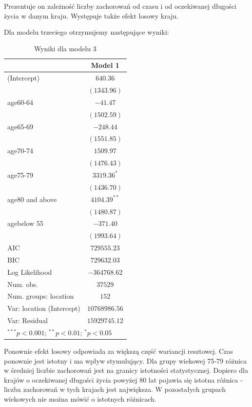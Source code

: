 \documentclass[12pt]{mwbk}
\theoremstyle{plain}
\theoremstyle{definition}
\theoremstyle{remark}
\begin{document}
Prezentuje on zależność liczby zachorowań od czasu i od oczekiwanej długości życia w danym kraju. Występuje także efekt losowy kraju.

Dla modelu trzeciego otrzymujemy następujące wyniki:

\begin{table}
	\begin{center}
		\begin{tabular}{l c}
			\hline
			& Model 1 \\
			\hline
			(Intercept)               & $640.36$       \\
			& $(1343.96)$    \\
			age60-64                  & $-41.47$       \\
			& $(1502.59)$    \\
			age65-69                  & $-248.44$      \\
			& $(1551.85)$    \\
			age70-74                  & $1509.97$      \\
			& $(1476.43)$    \\
			age75-79                  & $3319.36^{*}$  \\
			& $(1436.70)$    \\
			age80 and above           & $4104.39^{**}$ \\
			& $(1480.87)$    \\
			agebelow 55               & $-371.40$      \\
			& $(1993.64)$    \\
			\hline
			AIC                       & $729555.23$    \\
			BIC                       & $729632.03$    \\
			Log Likelihood            & $-364768.62$   \\
			Num. obs.                 & $37529$        \\
			Num. groups: location     & $152$          \\
			Var: location (Intercept) & $10768986.56$  \\
			Var: Residual             & $15929745.12$  \\
			\hline
			\multicolumn{2}{l}{\scriptsize{$^{***}p<0.001$; $^{**}p<0.01$; $^{*}p<0.05$}}
		\end{tabular}
		\caption{Wyniki dla modelu 3}
		\label{table:model3}
	\end{center}
\end{table}

Ponownie efekt losowy odpowiada za większą część wariancji resztowej. Czas ponownie jest istotny i ma wpływ stymulujący. Dla grupy wiekowej 75-79 różnica w średniej liczbie zachorowań jest na granicy istotności statystycznej. Dopiero dla krajów o oczekiwanej długości życia powyżej 80 lat pojawia się istotna różnica - liczba zachorowań w tych krajach jest największa. W pozostałych grupach wiekowych nie można mówić o istotnych różnicach. 
\end{document}
